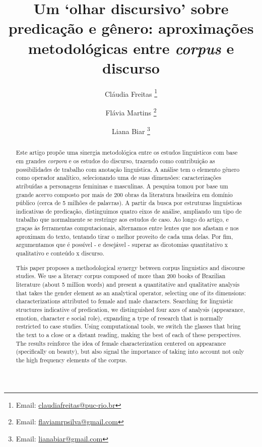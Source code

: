 \documentclass[portuguese]{textolivre}
\title{Um ‘olhar discursivo’ sobre predicação e gênero: aproximações metodológicas entre \textit{corpus} e discurso}
\author[1]{Cláudia Freitas \orcid{0000-0001-6807-8558} \thanks{Email: \url{claudiafreitas@puc-rio.br}}}
\author[1]{Flávia Martins \orcid{0000-0001-6346-2032} \thanks{Email: \url{flaviamrpsilva@gmail.com}}}
\author[1]{Liana Biar \orcid{0000-0002-8673-8668} \thanks{Email: \url{lianabiar@gmail.com}}}
\affil[1]{Pontifícia Universidade Católica do Rio de Janeiro, Departamento de Letras, Rio de Janeiro, RJ, Brasil.}
\begin{document}
\maketitle

\begin{polyabstract}
\begin{abstract}
Este artigo propõe uma sinergia metodológica entre os estudos linguísticos com base em grandes \textit{corpora} e os estudos do discurso, trazendo como contribuição as possibilidades de trabalho com anotação linguística. A análise tem o elemento gênero como operador analítico, selecionando uma de suas dimensões: caracterizações atribuídas a personagens femininas e masculinas. A pesquisa tomou por base um grande acervo composto por mais de 200 obras da literatura brasileira em domínio público (cerca de 5 milhões de palavras). A partir da busca por estruturas linguísticas indicativas de predicação, distinguimos quatro eixos de análise, ampliando um tipo de trabalho que normalmente se restringe aos estudos de caso. Ao longo do artigo, e graças às ferramentas computacionais, alternamos entre lentes que nos afastam e nos aproximam do texto, tentando tirar o melhor proveito de cada uma delas. Por fim, argumentamos que é possível - e desejável - superar as dicotomias quantitativo x qualitativo e conteúdo x discurso.

\end{abstract}

\begin{english}
\begin{abstract}
This paper proposes a methodological synergy between corpus linguistics and discourse studies. We use a literary corpus composed of more than 200 books of Brazilian literature (about 5 million words) and present a quantitative and qualitative analysis that takes the gender element as an analytical operator, selecting one of its dimensions: characterizations attributed to female and male characters. Searching for linguistic structures indicative of predication, we distinguished four axes of analysis (appearance, emotion, character e social role), expanding a type of research that is normally restricted to case studies. Using computational tools, we switch the glasses that bring the text to a close or a distant reading, making the best of each of these perspectives. The results reinforce the idea of female characterization centered on appearance (specifically on beauty), but also signal the importance of taking into account not only the high frequency elements of the corpus.

\end{abstract}
\end{english}
\end{polyabstract}
\end{document}
